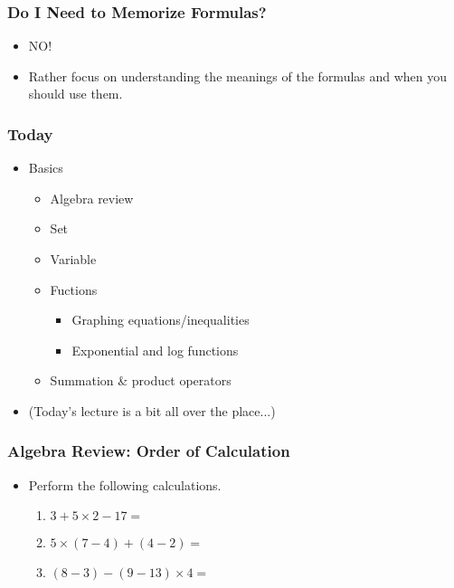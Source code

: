 \documentclass[pdflatex, 12pt]{beamer}
\begin{document}
\begin{frame}
\frametitle{Do I Need to Memorize Formulas?}
\begin{itemize}
\item NO!
\vspace{0.4cm}
\item Rather focus on understanding the meanings of the formulas and when you should use them.
\end{itemize}
\end{frame}

\begin{frame}
\frametitle{Today}
\begin{itemize}
\item Basics
 \begin{itemize}
 \item Algebra review
 \item Set
 \item Variable
 \item Fuctions
  \begin{itemize}
  \item Graphing equations/inequalities
  \item Exponential and log functions
  \end{itemize}
 \item Summation \& product operators
 \end{itemize}
\vspace{0.4cm}
\item (Today's lecture is a bit all over the place...)
\end{itemize}
\end{frame}

\begin{frame}
\frametitle{Algebra Review: Order of Calculation}
\begin{itemize}
\item Perform the following calculations.
 \begin{enumerate}
 \item $3 + 5 \times 2 - 17 = $
 \item $5 \times (7 - 4) + (4 - 2) = $
 \item $(8 - 3) - (9 - 13) \times 4 = $
 \end{enumerate}
\end{itemize}
\end{frame}
\end{document}
